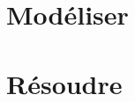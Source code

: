\documentclass[10pt,fleqn]{book} %
\newcommand{\repStyle}{../../Style}
\begin{document}
\def\xxcompetences{}
\def\xxfigures{}

\graphicspath{{\repStyle/png/}}



\setlength{\columnseprule}{.1pt}

\chapter{Modéliser}


\pagestyle{fancy}
\thispagestyle{plain}


\stopcontents

\chapter{Résoudre}
\newpage


\pagestyle{fancy}
\thispagestyle{plain}

\stopcontents

\newpage
\printindex
\end{document}
